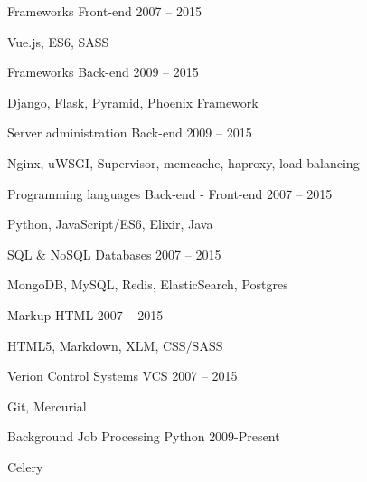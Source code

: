 \begin{cventries}
  \cventry
    {Frameworks}
    {Front-end}
    {}
    {2007 – 2015}
    {
      \begin{cvitems}
        \item {Vue.js, ES6, SASS}
      \end{cvitems}
    }
  \cventry
    {Frameworks}
    {Back-end}
    {}
    {2009 – 2015}
    {
      \begin{cvitems}
        \item {Django, Flask, Pyramid, Phoenix Framework}
      \end{cvitems}
    }
  \cventry
    {Server administration}
    {Back-end}
    {}
    {2009 – 2015}
    {
      \begin{cvitems}
        \item {Nginx, uWSGI, Supervisor, memcache, haproxy, load balancing}
      \end{cvitems}
    }
  \cventry
    {Programming languages}
    {Back-end - Front-end}
    {}
    {2007 – 2015}
    {
      \begin{cvitems}
        \item {Python, JavaScript/ES6, Elixir, Java}
      \end{cvitems}
    }
  \cventry
    {SQL \& NoSQL}
    {Databases}
    {}
    {2007 – 2015}
    {
      \begin{cvitems}
        \item {MongoDB, MySQL, Redis, ElasticSearch, Postgres}
      \end{cvitems}
    }
  \cventry
    {Markup}
    {HTML}
    {}
    {2007 – 2015}
    {
      \begin{cvitems}
        \item {HTML5, Markdown, XLM, CSS/SASS}
      \end{cvitems}
    }
  \cventry
    {Verion Control Systems}
    {VCS}
    {}
    {2007 – 2015}
    {
      \begin{cvitems}
        \item {Git, Mercurial}
      \end{cvitems}
    }
  \cventry
    {Background Job Processing}
    {Python}
    {}
    {2009-Present}
    {
      \begin{cvitems}
        \item {Celery}
      \end{cvitems}
    }
\end{cventries}
